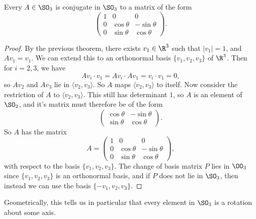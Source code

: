 \documentclass[a4]{scrreprt}
\begin{document}
\begin{corollary}
	Every $A \in \SO_3$ is conjugate in $\SO_3$ to a matrix of the form
	$$
	\begin{pmatrix}
		1 & 0 & 0 \\
		0 & \cos \theta & - \sin \theta \\
		0 & \sin \theta & \cos \theta
	\end{pmatrix}.
	$$
\end{corollary}
\begin{proof}
	By the previous theorem, there exists $v_1 \in \R^3$ such that $|v_1| = 1$, and $Av_1 = v_1$. We can extend this to an orthonormal basis $\{v_1, v_2, v_3\}$ of $\R^3$. Then for $i = 2, 3$, we have 
	$$
Av_i \cdot v_1 = A v_i \cdot Av_1 = v_i \cdot v_1 = 0,
	$$
	so $Av_2$ and $Av_3$ lie in $\langle v_2, v_3 \rangle$. So $A$ maps $\langle v_2, v_3 \rangle$ to itself. Now consider the restriction of $A$ to $\langle v_2, v_3 \rangle$. This still has determinant $1$, so $A$ is an element of $\SO_2$, and it's matrix must therefore be of the form
	$$
	\begin{pmatrix}
		\cos \theta & - \sin \theta \\
		\sin \theta & \cos \theta
	\end{pmatrix}.
	$$
	So $A$ has the matrix
	$$
A = \begin{pmatrix}
	1 & 0 & 0 \\
	0 & \cos \theta & - \sin \theta \\
	0 & \sin \theta & \cos \theta
\end{pmatrix},
	$$
	with respect to the basis $\{v_1, v_2, v_3\}$. The change of basis matrix $P$ lies in $\OO_3$ since $\{v_1, v_2, v_3\}$ is an orthonormal basis, and if $P$ does not lie in $\SO_3$, then instead we can use the basis $\{-v_1, v_2, v_3\}$.
\end{proof}

Geometrically, this tells us in particular that every element in $\SO_3$ is a rotation about some axis. 
\end{document}
